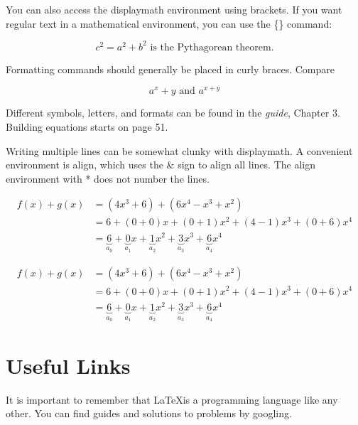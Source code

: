 \documentclass[12pt, titlepage, a4paper]{article}  %
\begin{document}
You can also access the displaymath environment using brackets. If you want regular text in a mathematical environment, you can use the \textrm\{\} command:

\[ c^{2}=a^{2}+b^{2} \textrm{ is the Pythagorean theorem.} \]

Formatting commands should generally be placed in curly braces. Compare

\[ a^x+y \textrm{ and } a^{x+y} \]

Different symbols, letters, and formats can be found in the \emph{guide}, Chapter 3. Building equations starts on page 51.

Writing multiple lines can be somewhat clunky with displaymath. A convenient environment is align, which uses the \& sign to align all lines. The align environment with * does not number the lines.

\begin{align*}
f(x) + g(x) &= (4x^3 + 6)+ (6x^4 -x^3 + x^2)\\
&= 6 + (0+0)x+(0+1)x^2 + (4-1)x^3+(0+6)x^4\\
&= \underbrace{6}_{a_0} + \underbrace{0}_{a_1}x + \underbrace{1}_{a_2}x^2 + \underbrace{3}_{a_3}x^3 + \underbrace{6}_{a_4} x^4
\end{align*}

\begin{align}
f(x) + g(x) &= (4x^3 + 6)+ (6x^4 -x^3 + x^2)\\
&= 6 + (0+0)x+(0+1)x^2 + (4-1)x^3+(0+6)x^4\\
&= \underbrace{6}_{a_0} + \underbrace{0}_{a_1}x + \underbrace{1}_{a_2}x^2 + \underbrace{3}_{a_3}x^3 + \underbrace{6}_{a_4} x^4
\end{align}




\section{Useful Links}

It is important to remember that \LaTeX is a programming language like any other. You can find guides and solutions to problems by googling.
\end{document}
